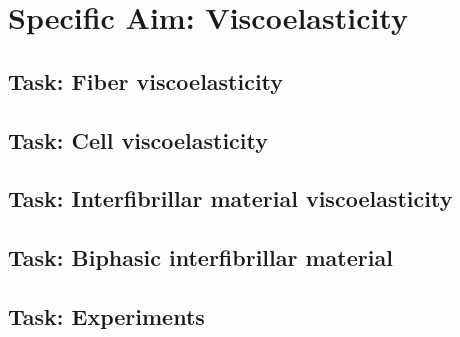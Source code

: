 \documentclass{article}
\begin{document}
\section{Specific Aim: Viscoelasticity}

\subsection{Task: Fiber viscoelasticity}

\subsection{Task: Cell viscoelasticity}

\subsection{Task: Interfibrillar material viscoelasticity}

\subsection{Task: Biphasic interfibrillar material}

\subsection{Task: Experiments}
\end{document}
